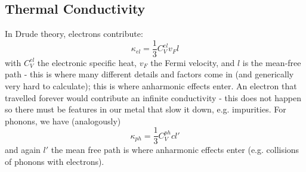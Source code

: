 \subsection{Thermal Conductivity}
In Drude theory, electrons contribute:
\begin{equation}
    \kappa_{el} = \frac{1}{3}C^{el}_V v_F l
\end{equation}
with $C^{el}_V$ the electronic specific heat, $v_F$ the Fermi velocity, and $l$ is the mean-free path - this is where many different details and factors come in (and generically very hard to calculate); this is where anharmonic effects enter. An electron that travelled forever would contribute an infinite conductivity - this does not happen so there must be features in our metal that slow it down, e.g. impurities. For phonons, we have (analogously)
\begin{equation}
    \kappa_{ph} = \frac{1}{3}C^{ph}_V c l'
\end{equation}
and again $l'$ the mean free path is where anharmonic effects enter (e.g. collisions of phonons with electrons).